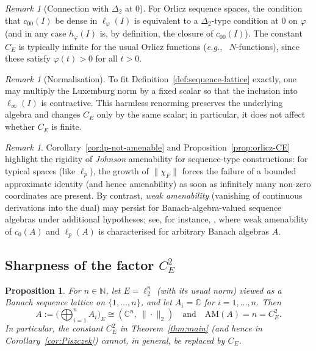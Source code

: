 \documentclass[reqno]{amsart}
\theoremstyle{plain}
\newtheorem{proposition}[theorem]{Proposition}
\theoremstyle{definition}
\theoremstyle{remark}
\newtheorem{remark}[theorem]{Remark}
\newcommand{\AM}{\mathrm{AM}}
\begin{document}
\begin{remark}[Connection with $\Delta_2$ at $0$]\label{rem:orlicz-delta2}
For Orlicz sequence spaces, the condition that $c_{00}(I)$ be dense in $\ell_\varphi(I)$ is
equivalent to a $\Delta_2$-type condition at $0$ on $\varphi$ (and in any case $h_\varphi(I)$ is,
by definition, the closure of $c_{00}(I)$).  The constant $C_E$ is typically infinite for the usual
Orlicz functions (\emph{e.g.}, \ $N$-functions), since these satisfy $\varphi(t)>0$ for all $t>0$.
\end{remark}

\begin{remark}[Normalisation]\label{rem:orlicz-normalisation}
To fit Definition~\ref{def:sequence-lattice} exactly, one may multiply the Luxemburg norm by a fixed scalar so that the inclusion into $\ell_\infty(I)$ is contractive.  This harmless renorming preserves the underlying algebra and changes $C_E$ only by the same scalar; in particular, it does not affect whether $C_E$ is finite.
\end{remark}

\begin{remark}\label{rem:weak-amenability}
Corollary~\ref{cor:lp-not-amenable} and Proposition~\ref{prop:orlicz-CE} highlight the rigidity of \emph{Johnson}
amenability for sequence-type constructions: for typical spaces (like $\ell_p$), the growth of $\|\chi_F\|$
forces the failure of a bounded approximate identity
(and hence amenability) as soon as infinitely many non-zero coordinates are present.
By contrast, \emph{weak amenability} (vanishing of continuous derivations into the dual)
may persist for Banach-algebra-valued sequence algebras under additional hypotheses;
see, for instance, \cite{KoczorowskiPiszczek2024WeakAmenability}, where weak amenability of
$c_0(A)$ and $\ell_p(A)$ is characterised for arbitrary Banach algebras $A$.
\end{remark}


\subsection{Sharpness of the factor $C_E^2$}

\begin{proposition}\label{prop:CE2-sharp}
For $n\in\mathbb N$, let $E=\ell_2^n$ (with its usual norm) viewed as a Banach
sequence lattice on $\{1,\dots,n\}$, and let $A_i=\mathbb C$ for $i=1,\dots,n$.
Then
\[
A:=\Big(\bigoplus_{i=1}^n A_i\Big)_E \cong (\mathbb C^n,\ \|\cdot\|_2)
\quad\text{and}\quad
\AM(A)=n=C_E^2.
\]
In particular, the constant $C_E^2$ in Theorem~\ref{thm:main}
(and hence in Corollary~\ref{cor:Piszczek}) cannot, in general, be replaced by
$C_E$.
\end{proposition}
\end{document}
